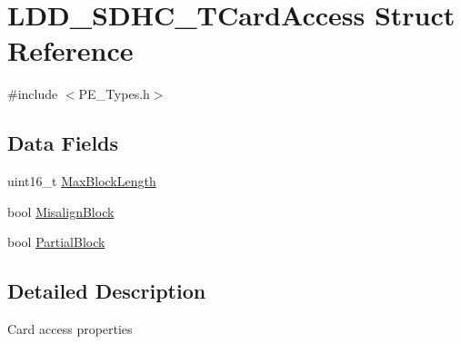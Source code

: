 \hypertarget{struct_l_d_d___s_d_h_c___t_card_access}{\section{L\-D\-D\-\_\-\-S\-D\-H\-C\-\_\-\-T\-Card\-Access Struct Reference}
\label{struct_l_d_d___s_d_h_c___t_card_access}
}


{\ttfamily \#include $<$P\-E\-\_\-\-Types.\-h$>$}

\subsection*{Data Fields}
\begin{DoxyCompactItemize}
\item 
uint16\-\_\-t \hyperlink{struct_l_d_d___s_d_h_c___t_card_access_aeeba296e7a8dc6164c925b816416ef2e}{Max\-Block\-Length}
\item 
bool \hyperlink{struct_l_d_d___s_d_h_c___t_card_access_aa56e65353fd03ffdbd8cc8d19537b621}{Misalign\-Block}
\item 
bool \hyperlink{struct_l_d_d___s_d_h_c___t_card_access_a9d78668915e934548a04351b20ec2d0a}{Partial\-Block}
\end{DoxyCompactItemize}


\subsection{Detailed Description}
Card access properties 

